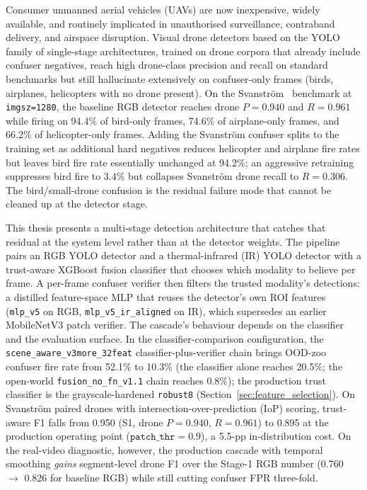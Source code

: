 \documentclass[12pt,a4paper,oneside,openright]{book}
\begin{document}
Consumer unmanned aerial vehicles (UAVs) are now inexpensive, widely available, and routinely implicated in unauthorised surveillance, contraband delivery, and airspace disruption. Visual drone detectors based on the YOLO family of single-stage architectures, trained on drone corpora that already include confuser negatives, reach high drone-class precision and recall on standard benchmarks but still hallucinate extensively on confuser-only frames (birds, airplanes, helicopters with no drone present). On the Svanstr\"om~\cite{svanstrom2021real} benchmark at \texttt{imgsz=1280}, the baseline RGB detector reaches drone $P=0.940$ and $R=0.961$ while firing on 94.4\% of bird-only frames, 74.6\% of airplane-only frames, and 66.2\% of helicopter-only frames. Adding the Svanstr\"om confuser splits to the training set as additional hard negatives reduces helicopter and airplane fire rates but leaves bird fire rate essentially unchanged at 94.2\%; an aggressive retraining suppresses bird fire to 3.4\% but collapses Svanstr\"om drone recall to $R=0.306$. The bird/small-drone confusion is the residual failure mode that cannot be cleaned up at the detector stage.

This thesis presents a multi-stage detection architecture that catches that residual at the system level rather than at the detector weights. The pipeline pairs an RGB YOLO detector and a thermal-infrared (IR) YOLO detector with a trust-aware XGBoost fusion classifier that chooses which modality to believe per frame. A per-frame confuser verifier then filters the trusted modality's detections: a distilled feature-space MLP that reuses the detector's own ROI features (\texttt{mlp\_v5} on RGB, \texttt{mlp\_v5\_ir\_aligned} on IR), which supersedes an earlier MobileNetV3 patch verifier. The cascade's behaviour depends on the classifier and the evaluation surface. In the classifier-comparison configuration, the \texttt{scene\_aware\_v3more\_32feat} classifier-plus-verifier chain brings OOD-zoo confuser fire rate from 52.1\% to 10.3\% (the classifier alone reaches 20.5\%; the open-world \texttt{fusion\_no\_fn\_v1.1} chain reaches 0.8\%); the production trust classifier is the grayscale-hardened \texttt{robust8} (Section~\ref{sec:feature_selection}). On Svanstr\"om paired drones with intersection-over-prediction (IoP) scoring, trust-aware F1 falls from 0.950 (S1, drone $P=0.940$, $R=0.961$) to 0.895 at the production operating point ($\mathtt{patch\_thr}=0.9$), a 5.5-pp in-distribution cost. On the real-video diagnostic, however, the production cascade with temporal smoothing \emph{gains} segment-level drone F1 over the Stage-1 RGB number (0.760 $\to$ 0.826 for baseline RGB) while still cutting confuser FPR three-fold.
\end{document}
